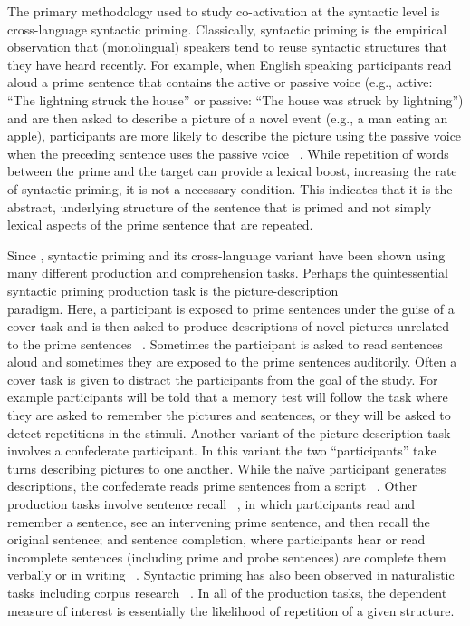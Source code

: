 The primary methodology used to study co-activation at the syntactic level is cross-language syntactic priming. Classically, syntactic priming is the empirical observation that (monolingual) speakers tend to reuse syntactic structures that they have heard recently. For example, when English speaking participants read aloud a prime sentence that contains the active or passive voice (e.g., active: ``The lightning struck the house'' or passive: ``The house was struck by lightning'') and are then asked to describe a picture of a novel event (e.g., a man eating an apple), participants are more likely to describe the picture using the passive voice when the preceding sentence uses the passive voice ~\citep{Bock1986}. While repetition of words between the prime and the target can provide a lexical boost, increasing the rate of syntactic priming, it is not a necessary condition. This indicates that it is the abstract, underlying structure of the sentence that is primed and not simply lexical aspects of the prime sentence that are repeated. 

Since  \citet{Bock1986}, syntactic priming and its cross-language variant have been shown using many different production and comprehension tasks. Perhaps the quintessential syntactic priming production task is the picture-description\\ paradigm. Here, a participant is exposed to prime sentences under the guise of a cover task and is then asked to produce descriptions of novel pictures unrelated to the prime sentences ~\citep{Chen2013}. Sometimes the participant is asked to read sentences aloud and sometimes they are exposed to the prime sentences auditorily. Often a cover task is given to distract the participants from the goal of the study. For example participants will be told that a memory test will follow the task where they are asked to remember the pictures and sentences, or they will be asked to detect repetitions in the stimuli. Another variant of the picture description task involves a confederate participant. In this variant the two ``participants'' take turns describing pictures to one another. While the na\"{i}ve participant generates descriptions, the confederate reads prime sentences from a script ~\citep{Bernolet2010, Bernolet2013, Chen2013, Hartsuiker2004}. Other production tasks involve sentence recall ~\citep{Meijer2003, Potter1998, Shin2009}, in which participants read and remember a sentence, see an intervening prime sentence, and then recall the original sentence; and sentence completion, where participants hear or read incomplete sentences (including prime and probe sentences) are complete them verbally or in writing ~\citep{Branigan2000,Desmet2006, Pickering1998, Hatzidaki2011, Salamoura2007}. Syntactic priming has also been observed in naturalistic tasks including corpus research ~\citep{Cacoullos2010,Gries2005, Jaeger2007, Szmrecsanyi2006,Travis}. In all of the production tasks, the dependent measure of interest is essentially the likelihood of repetition of a given structure. 

